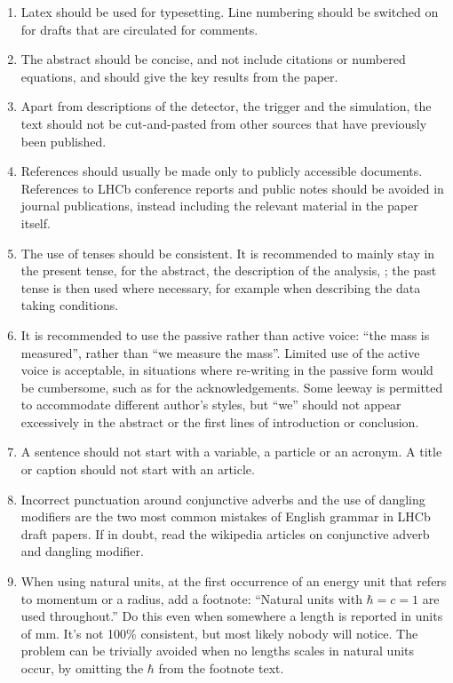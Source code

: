 \begin{enumerate}
\item Latex should be used for typesetting. Line numbering should be
  switched on for drafts that are circulated for comments.

\item The abstract should be concise, and not include citations or
  numbered equations, and should give the key results from the paper.

\item Apart from descriptions of the detector, the trigger and the
  simulation, the text should not be cut-and-pasted from other sources
  that have previously been published.

\item References should usually be made only to publicly accessible
  documents. References to LHCb conference reports and public notes
  should be avoided in journal publications, instead including the
  relevant material in the paper itself.

\item The use of tenses should be consistent. It is recommended to
  mainly stay in the present tense, for the abstract, the description
  of the analysis, \etc; the past tense is then used where necessary,
  for example when describing the data taking conditions.

\item It is recommended to use the passive rather than active voice:
  ``the mass is measured'', rather than ``we measure the mass''.
  Limited use of the active voice is acceptable, in situations where
  re-writing in the passive form would be cumbersome, such as for the
  acknowledgements.  Some leeway is permitted to accommodate different
  author's styles, but ``we'' should not appear excessively in the
  abstract or the first lines of introduction or conclusion.

\item A sentence should not start with a variable, a particle or an acronym.
 A title or caption should not start with an article. 

\item Incorrect punctuation around conjunctive adverbs and the use of 
dangling modifiers are the two most common mistakes of English grammar
in LHCb draft papers. If in doubt, read the wikipedia articles on 
conjunctive adverb and dangling modifier.  

\item When using natural units, at the first occurrence of an energy unit
      that refers to momentum or a radius, add a footnote: ``Natural units
      with $\hbar=c=1$ are used throughout.'' Do this even when somewhere
      a length is reported in units of mm. It's not 100\% consistent, but
      most likely nobody will notice. The problem can be trivially avoided
      when no lengths scales in natural units occur, by omitting the 
      $\hbar$ from the footnote text.


\end{enumerate}
